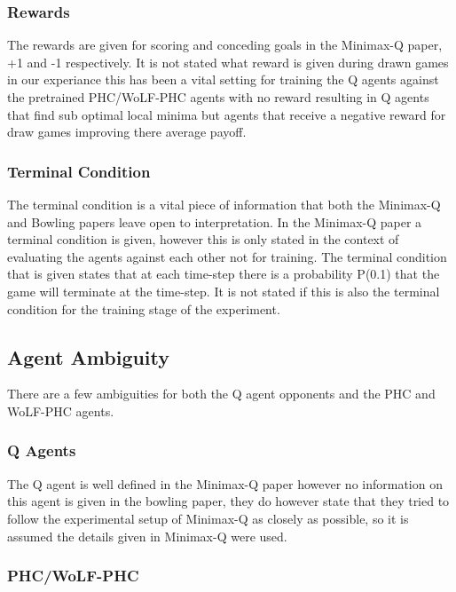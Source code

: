 \documentclass{article}
\begin{document}
\subsubsection*{Rewards}

The rewards are given for scoring and conceding goals in the Minimax-Q paper, +1 and -1 respectively. It is not stated what reward is given during drawn games in our experiance this has been a vital setting for training the Q agents against the pretrained PHC/WoLF-PHC agents with no reward resulting in Q agents that find sub optimal local minima but agents that receive a negative reward for draw games improving there average payoff.

\subsubsection*{Terminal Condition}
The terminal condition is a vital piece of information that both the Minimax-Q and Bowling papers leave open to interpretation. In the Minimax-Q paper a terminal condition is given, however this is only stated in the context of evaluating the agents against each other not for training. The terminal condition that is given states that at each time-step there is a probability P(0.1) that the game will terminate at the time-step. It is not stated if this is also the terminal condition for the training stage of the experiment.

\subsection*{Agent Ambiguity}

There are a few ambiguities for both the Q agent opponents and the PHC and WoLF-PHC agents. 

\subsubsection*{Q Agents}

The Q agent is well defined in the Minimax-Q paper however no information on this agent is given in the bowling paper, they do however state that they tried to follow the experimental setup of Minimax-Q as closely as possible, so it is assumed the details given in Minimax-Q were used.

\subsubsection*{PHC/WoLF-PHC}
\end{document}

